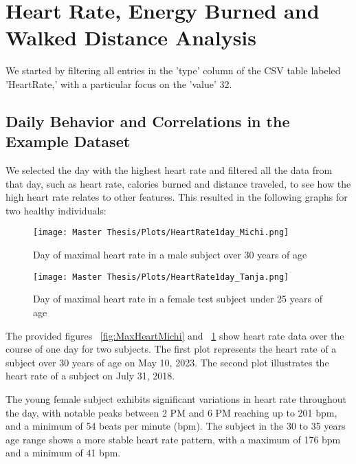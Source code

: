 \section{Heart Rate, Energy Burned and Walked Distance Analysis}

We started by filtering all entries in the 'type' column of the CSV table labeled 'HeartRate,' with a particular focus on the 'value' 32.

\subsection{Daily Behavior and Correlations in the Example Dataset}
We selected the day with the highest heart rate and filtered all the data from that day, such as heart rate, calories burned and distance traveled, to see how the high heart rate relates to other features. This resulted in the following graphs for two healthy individuals:

\FloatBarrier
\begin{figure}[h!]
  \centering
  \begin{minipage}[b]{0.8\linewidth}
    \texttt{[image: Master Thesis/Plots/HeartRate1day\_Michi.png]}
    \caption{Day of maximal heart rate in a male subject over 30 years of age}
    \label{fig:MaxHeartMichi}
  \end{minipage}
  \quad %
  \begin{minipage}[b]{0.8\linewidth}
    \texttt{[image: Master Thesis/Plots/HeartRate1day\_Tanja.png]}
    \caption{Day of maximal heart rate in a female test subject under 25 years of age}
    \label{fig:MaxHeartTanja}
  \end{minipage}
\end{figure}
\FloatBarrier

The provided figures ~\ref{fig:MaxHeartMichi} and ~\ref{fig:MaxHeartTanja} show heart rate data over the course of one day for two subjects. The first plot represents the heart rate of a subject over 30 years of age on May 10, 2023. The second plot illustrates the heart rate of a subject on July 31, 2018.

The young female subject exhibits significant variations in heart rate throughout the day, with notable peaks between 2 PM and 6 PM reaching up to 201 bpm, and a minimum of 54 beats per minute (bpm). The subject in the 30 to 35 years age range shows a more stable heart rate pattern, with a maximum of 176 bpm and a minimum of 41 bpm.

